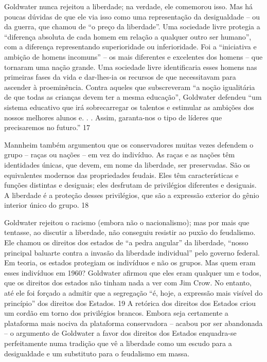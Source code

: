  
\par
 
Goldwater nunca rejeitou a liberdade; na verdade, ele comemorou isso. Mas há poucas dúvidas de que ele via isso como uma representação da desigualdade – ou da guerra, que chamou de “o preço da liberdade”. Uma sociedade livre protegia a “diferença absoluta de cada homem em relação a qualquer outro ser humano”, com a diferença representando superioridade ou inferioridade. Foi a “iniciativa e ambição de homens incomuns” – os mais diferentes e excelentes dos homens – que tornaram uma nação grande. Uma sociedade livre identificaria esses homens nas primeiras fases da vida e dar-lhes-ia os recursos de que necessitavam para ascender à proeminência. Contra aqueles que subscreveram “a noção igualitária de que todas as crianças devem ter a mesma educação”, Goldwater defendeu “um sistema educativo que irá sobrecarregar os talentos e estimular as ambições dos nossos melhores alunos e. . . Assim, garanta-nos o tipo de líderes que precisaremos no futuro.”
 {\color{blue} 17}  

 
\par
 
Mannheim também argumentou que os conservadores muitas vezes defendem o grupo – raças ou nações – em vez do indivíduo. As raças e as nações têm identidades únicas, que devem, em nome da liberdade, ser preservadas. São os equivalentes modernos das propriedades feudais. Eles têm características e funções distintas e desiguais; eles desfrutam de privilégios diferentes e desiguais. A liberdade é a proteção desses privilégios, que são a expressão exterior do gênio interior único do grupo.
 {\color{blue} 18}  

 
\par
 
Goldwater rejeitou o racismo (embora não o nacionalismo); mas por mais que tentasse, ao discutir a liberdade, não conseguiu resistir ao puxão do feudalismo. Ele chamou os direitos dos estados de “a pedra angular” da liberdade, “nosso principal baluarte contra a invasão da liberdade individual” pelo governo federal. Em teoria, os estados protegiam os indivíduos e não os grupos. Mas quem eram esses indivíduos em 1960? Goldwater afirmou que eles eram qualquer um e todos, que os direitos dos estados não tinham nada a ver com Jim Crow. No entanto, até ele foi forçado a admitir que a segregação “é, hoje, a expressão mais visível do princípio” dos direitos dos Estados.
 {\color{blue} 19}  
A retórica dos direitos dos Estados criou um cordão em torno dos privilégios brancos. Embora seja certamente a plataforma mais nociva da plataforma conservadora – acabou por ser abandonada – o argumento de Goldwater a favor dos direitos dos Estados enquadra-se perfeitamente numa tradição que vê a liberdade como um escudo para a desigualdade e um substituto para o feudalismo em massa.
 
